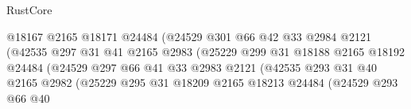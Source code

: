 \begin{lexlean}{RustCore}
\begin{coremodule}
                                          @18167
                                          @2165
                                          @18171
                                          @24484
                                          (@24529
                                            @301
                                            @66
                                            @42
                                            @33
                                            @2984
                                            @2121
                                            (@42535
                                              @297
                                              @31
                                              @41
                                              @2165
                                              @2983
                                              (@25229
                                                @299
                                                @31
                                                @18188
                                                @2165
                                                @18192
                                                @24484
                                                (@24529
                                                  @297
                                                  @66
                                                  @41
                                                  @33
                                                  @2983
                                                  @2121
                                                  (@42535
                                                    @293
                                                    @31
                                                    @40
                                                    @2165
                                                    @2982
                                                    (@25229
                                                      @295
                                                      @31
                                                      @18209
                                                      @2165
                                                      @18213
                                                      @24484
                                                      (@24529
                                                        @293
                                                        @66
                                                        @40

\end{coremodule}
\end{lexlean}
